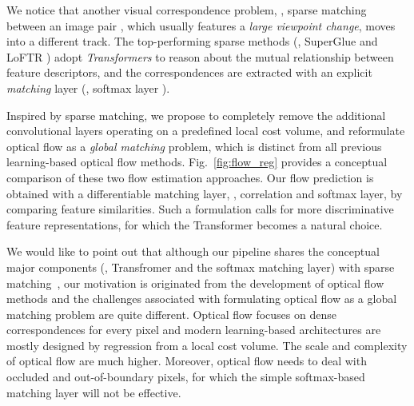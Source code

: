 \documentclass[10pt,twocolumn,letterpaper]{article}
\begin{document}
We notice that another visual correspondence problem, \ie, sparse matching between an image pair \cite{sarlin2020superglue,wang2020learning,sun2021loftr}, which usually features a \emph{large viewpoint change}, moves into a different track. The top-performing sparse methods (\eg, SuperGlue \cite{sarlin2020superglue} and LoFTR \cite{sun2021loftr}) adopt \emph{Transformers} \cite{vaswani2017attention} to reason about the mutual relationship between feature descriptors, and the correspondences are extracted with an explicit \emph{matching} layer (\eg, softmax layer \cite{wang2020learning}). 





Inspired by sparse matching, we propose to completely remove the additional convolutional layers operating on a predefined local cost volume, and reformulate optical flow as a \emph{global matching} problem, which is distinct from all previous learning-based optical flow methods. Fig.~\ref{fig:flow_reg} provides a conceptual comparison of these two flow estimation approaches. Our flow prediction is obtained with a differentiable matching layer, \ie, correlation and softmax layer, by comparing feature similarities. Such a formulation calls for more discriminative feature representations, for which the Transformer \cite{vaswani2017attention} becomes a natural choice.



We would like to point out that although our pipeline shares the conceptual major components (\ie, Transfromer and the softmax matching layer) with sparse matching~\cite{sarlin2020superglue,sun2021loftr}, our motivation is originated from the development of optical flow methods and the challenges associated with formulating optical flow as a global matching problem are quite different. Optical flow focuses on dense correspondences for every pixel and modern learning-based architectures are mostly designed by regression from a local cost volume. The scale and complexity of optical flow are much higher. Moreover, optical flow needs to deal with occluded and out-of-boundary pixels, for which the simple softmax-based matching layer will not be effective.   
\end{document}
